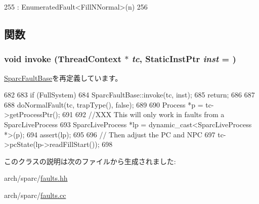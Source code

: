 \begin{DoxyCode}
255                             : EnumeratedFault<FillNNormal>(n)
256     {}
\end{DoxyCode}


\subsection{関数}
\hypertarget{classSparcISA_1_1FillNNormal_a2bd783b42262278d41157d428e1f8d6f}{
\subsubsection[{invoke}]{\setlength{\rightskip}{0pt plus 5cm}void invoke ({\bf ThreadContext} $\ast$ {\em tc}, \/  {\bf StaticInstPtr} {\em inst} = {})}}
\label{classSparcISA_1_1FillNNormal_a2bd783b42262278d41157d428e1f8d6f}


\hyperlink{classSparcISA_1_1SparcFaultBase_a2bd783b42262278d41157d428e1f8d6f}{SparcFaultBase}を再定義しています。


\begin{DoxyCode}
682 {
683     if (FullSystem) {
684         SparcFaultBase::invoke(tc, inst);
685         return;
686     }
687 
688     doNormalFault(tc, trapType(), false);
689 
690     Process *p = tc->getProcessPtr();
691 
692     //XXX This will only work in faults from a SparcLiveProcess
693     SparcLiveProcess *lp = dynamic_cast<SparcLiveProcess *>(p);
694     assert(lp);
695 
696     // Then adjust the PC and NPC
697     tc->pcState(lp->readFillStart());
698 }
\end{DoxyCode}


このクラスの説明は次のファイルから生成されました:\begin{DoxyCompactItemize}
\item 
arch/sparc/\hyperlink{arch_2sparc_2faults_8hh}{faults.hh}\item 
arch/sparc/\hyperlink{arch_2sparc_2faults_8cc}{faults.cc}\end{DoxyCompactItemize}
